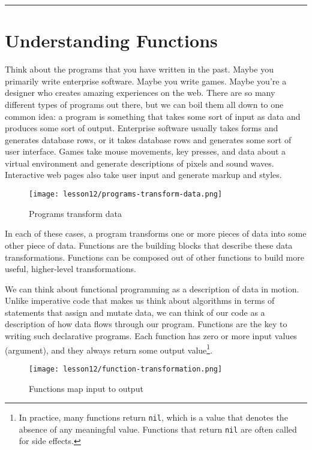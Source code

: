\documentclass[10pt,twoside,openright]{memoir}
\begin{document}
\begin{center}\rule{0.5\linewidth}{0.5pt}\end{center}


\section{Understanding Functions}

Think about the programs that you have written in the past. Maybe you
primarily write enterprise software. Maybe you write games. Maybe you're
a designer who creates amazing experiences on the web. There are so many
different types of programs out there, but we can boil them all down to
one common idea: a program is something that takes some sort of input as
data and produces some sort of output. Enterprise software usually takes
forms and generates database rows, or it takes database rows and
generates some sort of user interface. Games take mouse movements, key
presses, and data about a virtual environment and generate descriptions
of pixels and sound waves. Interactive web pages also take user input
and generate markup and styles.

\begin{figure}[H]
\caption{Programs transform data}
\centering
\texttt{[image: lesson12/programs-transform-data.png]}
\end{figure}

In each of these cases, a program transforms one or more pieces of data
into some other piece of data. Functions are the building blocks that
describe these data transformations. Functions can be composed out of
other functions to build more useful, higher-level transformations.

We can think about functional programming as a description of data in
motion. Unlike imperative code that makes us think about algorithms in
terms of statements that assign and mutate data, we can think of our
code as a description of how data flows through our program. Functions
are the key to writing such declarative programs. Each function has zero
or more input values (argument), and they always return some output
value\footnote{In practice, many functions return \texttt{nil}, which is
  a value that denotes the absence of any meaningful value. Functions
  that return \texttt{nil} are often called for side effects.}.

\begin{figure}[H]
\caption{Functions map input to output}
\centering
\texttt{[image: lesson12/function-transformation.png]}
\end{figure}
\end{document}
